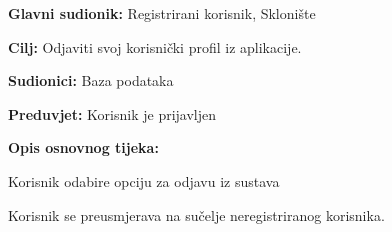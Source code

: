 					\pagebreak
                    \noindent {}
					\begin{packed_item}
						
						\item \textbf{Glavni sudionik: }Registrirani korisnik, Sklonište
						\item  \textbf{Cilj:} Odjaviti svoj korisnički profil iz aplikacije.
						\item  \textbf{Sudionici:} Baza podataka
						\item  \textbf{Preduvjet:} Korisnik je prijavljen
						\item  \textbf{Opis osnovnog tijeka:}
						
						\item[] \begin{packed_enum}
							
							\item Korisnik odabire opciju za odjavu iz sustava
							\item Korisnik se preusmjerava na sučelje neregistriranog korisnika.
						\end{packed_enum}
					\end{packed_item}
     
